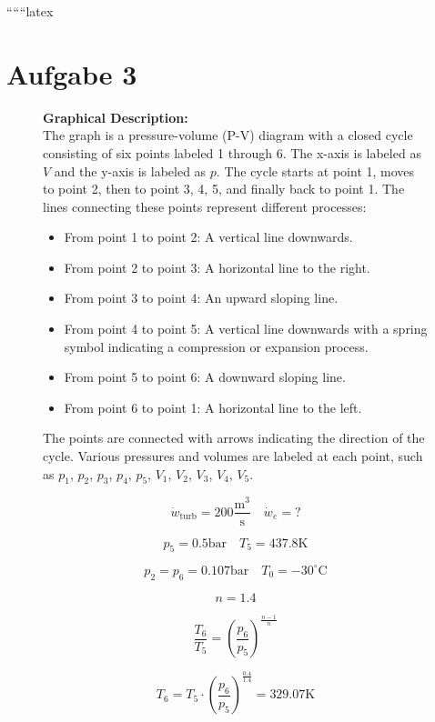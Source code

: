 
``````latex


\section*{Aufgabe 3}

\begin{figure}[h]
\centering
\begin{minipage}{0.8\textwidth}
\centering
\textbf{Graphical Description:} \\
The graph is a pressure-volume (P-V) diagram with a closed cycle consisting of six points labeled 1 through 6. The x-axis is labeled as $V$ and the y-axis is labeled as $p$. The cycle starts at point 1, moves to point 2, then to point 3, 4, 5, and finally back to point 1. The lines connecting these points represent different processes:
\begin{itemize}
    \item From point 1 to point 2: A vertical line downwards.
    \item From point 2 to point 3: A horizontal line to the right.
    \item From point 3 to point 4: An upward sloping line.
    \item From point 4 to point 5: A vertical line downwards with a spring symbol indicating a compression or expansion process.
    \item From point 5 to point 6: A downward sloping line.
    \item From point 6 to point 1: A horizontal line to the left.
\end{itemize}
The points are connected with arrows indicating the direction of the cycle. Various pressures and volumes are labeled at each point, such as $p_1$, $p_2$, $p_3$, $p_4$, $p_5$, $V_1$, $V_2$, $V_3$, $V_4$, $V_5$.
\end{minipage}
\end{figure}

\[
\dot{w}_{\text{turb}} = 200 \frac{\text{m}^3}{\text{s}} \quad \dot{w}_{e} = ?
\]

\[
p_5 = 0.5 \text{bar} \quad T_5 = 437.8 \text{K}
\]

\[
p_2 = p_6 = 0.107 \text{bar} \quad T_0 = -30^\circ \text{C}
\]

\[
n = 1.4
\]

\[
\frac{T_6}{T_5} = \left( \frac{p_6}{p_5} \right)^{\frac{n-1}{n}}
\]

\[
T_6 = T_5 \cdot \left( \frac{p_6}{p_5} \right)^{\frac{0.4}{1.4}} = 329.07 \text{K}
\]

